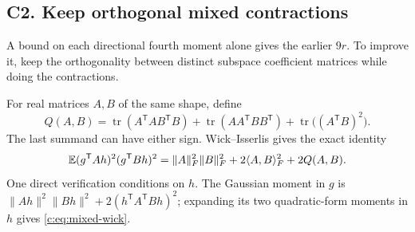 \documentclass[11pt]{article}
\numberwithin{equation}{section}
\theoremstyle{definition}\newtheorem{definition}[theorem]{Definition}
\theoremstyle{remark}\newtheorem{remark}[theorem]{Remark}
\newcommand{\tr}{\operatorname{tr}}\newcommand{\Ent}{\operatorname{Ent}}
\newcommand{\norm}[1]{\lVert#1\rVert}\newcommand{\ip}[2]{\langle#1,#2\rangle}
\begin{document}
\subsection{C2. Keep orthogonal mixed contractions}
A bound on each directional fourth moment alone gives the earlier $9r$. To improve it, keep the orthogonality between distinct subspace coefficient matrices while doing the contractions.

For real matrices $A,B$ of the same shape, define
\begin{equation}\label{c:eq:wick-Q}
 Q(A,B)=\tr(A^{\mathsf T}AB^{\mathsf T}B)
       +\tr(AA^{\mathsf T}BB^{\mathsf T})
       +\tr\big((A^{\mathsf T}B)^2\big).
\end{equation}
The last summand can have either sign. Wick--Isserlis gives the exact identity
\begin{equation}\label{c:eq:mixed-wick}
 \E(g^{\mathsf T}Ah)^2(g^{\mathsf T}Bh)^2
 =\norm A_F^2\norm B_F^2+2\ip{A}{B}_F^2+2Q(A,B).
\end{equation}
One direct verification conditions on $h$. The Gaussian moment in $g$ is
$\norm{Ah}^2\norm{Bh}^2+2(h^{\mathsf T}A^{\mathsf T}Bh)^2$;
expanding its two quadratic-form moments in $h$ gives \eqref{c:eq:mixed-wick}.
\end{document}
